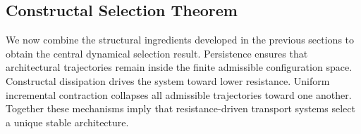 \documentclass[12pt]{article}
\theoremstyle{plain}
\theoremstyle{definition}
\theoremstyle{remark}
\begin{document}
\subsection{Constructal Selection Theorem}
\label{subsec:constructal_selection}

We now combine the structural ingredients developed in the previous
sections to obtain the central dynamical selection result.
Persistence ensures that architectural trajectories remain inside the
finite admissible configuration space.
Constructal dissipation drives the system toward lower resistance.
Uniform incremental contraction collapses all admissible trajectories
toward one another.
Together these mechanisms imply that resistance-driven transport
systems select a unique stable architecture.
\end{document}
